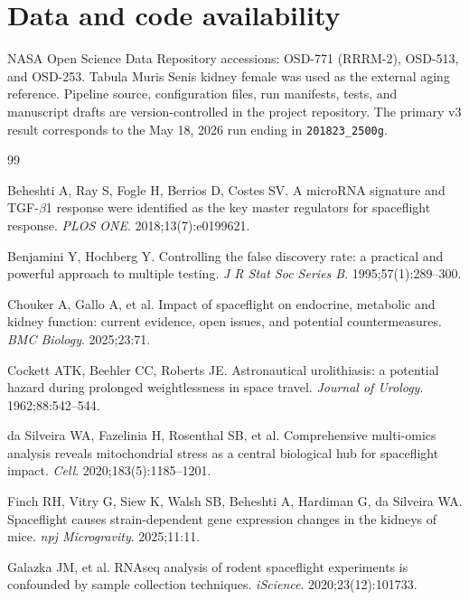 \documentclass[11pt]{article}
\newcommand{\code}[1]{\texttt{#1}}
\begin{document}
\section*{Data and code availability}
NASA Open Science Data Repository accessions: OSD-771 (RRRM-2), OSD-513, and OSD-253. Tabula Muris Senis kidney female was used as the external aging reference. Pipeline source, configuration files, run manifests, tests, and manuscript drafts are version-controlled in the project repository. The primary v3 result corresponds to the May 18, 2026 run ending in \code{201823\_2500g}.

\begin{thebibliography}{99}\small

 Beheshti A, Ray S, Fogle H, Berrios D, Costes SV. A microRNA signature and TGF-$\beta$1 response were identified as the key master regulators for spaceflight response. \emph{PLOS ONE}. 2018;13(7):e0199621.

 Benjamini Y, Hochberg Y. Controlling the false discovery rate: a practical and powerful approach to multiple testing. \emph{J R Stat Soc Series B}. 1995;57(1):289--300.

 Chouker A, Gallo A, et al. Impact of spaceflight on endocrine, metabolic and kidney function: current evidence, open issues, and potential countermeasures. \emph{BMC Biology}. 2025;23:71.

 Cockett ATK, Beehler CC, Roberts JE. Astronautical urolithiasis: a potential hazard during prolonged weightlessness in space travel. \emph{Journal of Urology}. 1962;88:542--544.

 da Silveira WA, Fazelinia H, Rosenthal SB, et al. Comprehensive multi-omics analysis reveals mitochondrial stress as a central biological hub for spaceflight impact. \emph{Cell}. 2020;183(5):1185--1201.

 Finch RH, Vitry G, Siew K, Walsh SB, Beheshti A, Hardiman G, da Silveira WA. Spaceflight causes strain-dependent gene expression changes in the kidneys of mice. \emph{npj Microgravity}. 2025;11:11.

 Galazka JM, et al. RNAseq analysis of rodent spaceflight experiments is confounded by sample collection techniques. \emph{iScience}. 2020;23(12):101733.


\end{thebibliography}
\end{document}
